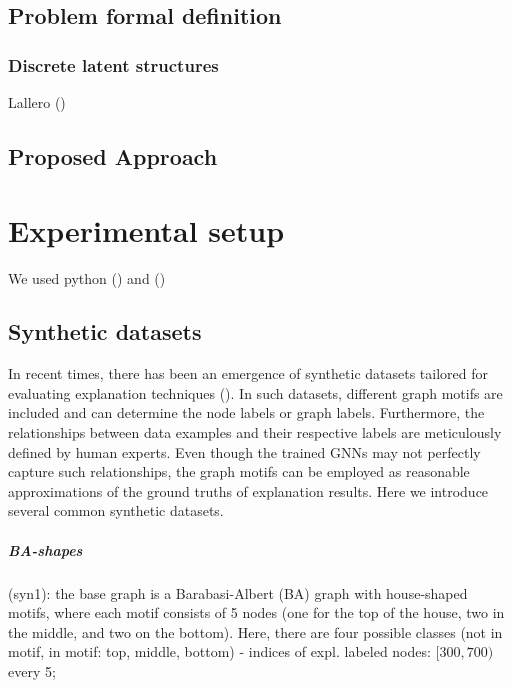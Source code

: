 \documentclass[binding=0.6cm]{sapthesis}
\newcommand{\mycite}[1]{(\cite{#1})}
\begin{document}
\section{Problem formal definition}
\label{sec:cfpg.bg.form-def}

\subsection{Discrete latent structures}
\label{sec:cfpg.bg.discrete-latent}
Lallero \mycite{niculae2023-discrete}

\section{Proposed Approach}
\label{sec:cfpg.bg.my-archs}





\chapter{Experimental setup}
\label{chap:4-expRes}
We used python \mycite{vanRossum2009-python} and \mycite{fey2019-PyG}

\section{Synthetic datasets}
\label{sec:expRes.syns-dataset}
In recent times, there has been an emergence of synthetic datasets tailored for evaluating explanation techniques (\cite{ying2019-gnnexplainer,luo2020-pgexplainer}). In such datasets, different graph motifs are included and can determine the node labels or graph labels. Furthermore, the relationships between data examples and their respective labels are meticulously defined by human experts. Even though the trained GNNs may not perfectly capture such relationships, the graph motifs can be employed as reasonable approximations of the ground truths of explanation results. Here we introduce several common synthetic datasets.

\paragraph{BA-shapes}
(syn1): the base graph is a Barabasi-Albert (BA) graph with house-shaped motifs, where each motif consists of 5 nodes (one for the top of the house, two in the middle, and two on the bottom). Here, there are four possible classes (not in motif, in motif: top, middle, bottom)  - indices of expl. labeled nodes: $[300,700)$ every 5;
\end{document}
